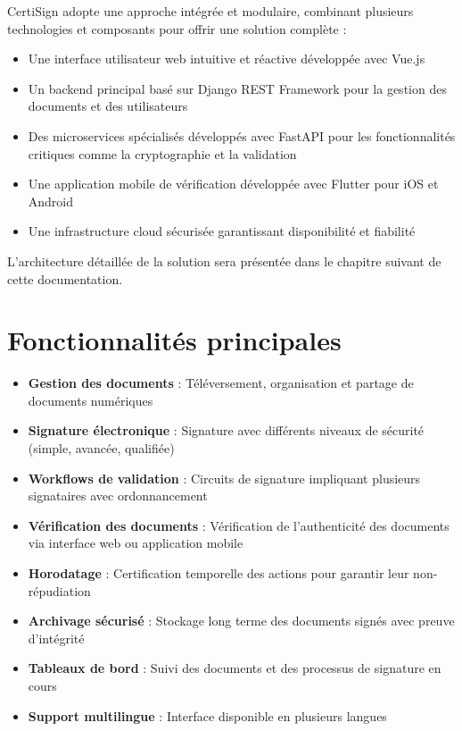 \documentclass[a4paper,12pt]{report}
\begin{document}
CertiSign adopte une approche intégrée et modulaire, combinant plusieurs technologies et composants pour offrir une solution complète :

\begin{itemize}
    \item Une interface utilisateur web intuitive et réactive développée avec Vue.js
    \item Un backend principal basé sur Django REST Framework pour la gestion des documents et des utilisateurs
    \item Des microservices spécialisés développés avec FastAPI pour les fonctionnalités critiques comme la cryptographie et la validation
    \item Une application mobile de vérification développée avec Flutter pour iOS et Android
    \item Une infrastructure cloud sécurisée garantissant disponibilité et fiabilité
\end{itemize}

L'architecture détaillée de la solution sera présentée dans le chapitre suivant de cette documentation.


\section{Fonctionnalités principales}

\begin{tcolorbox}[title=Fonctionnalités clés, colback=lightgreen!30!white]
\begin{itemize}
    \item \textbf{Gestion des documents} : Téléversement, organisation et partage de documents numériques
    \item \textbf{Signature électronique} : Signature avec différents niveaux de sécurité (simple, avancée, qualifiée)
    \item \textbf{Workflows de validation} : Circuits de signature impliquant plusieurs signataires avec ordonnancement
    \item \textbf{Vérification des documents} : Vérification de l'authenticité des documents via interface web ou application mobile
    \item \textbf{Horodatage} : Certification temporelle des actions pour garantir leur non-répudiation
    \item \textbf{Archivage sécurisé} : Stockage long terme des documents signés avec preuve d'intégrité
    \item \textbf{Tableaux de bord} : Suivi des documents et des processus de signature en cours
    \item \textbf{Support multilingue} : Interface disponible en plusieurs langues
\end{itemize}
\end{tcolorbox}
\end{document}
